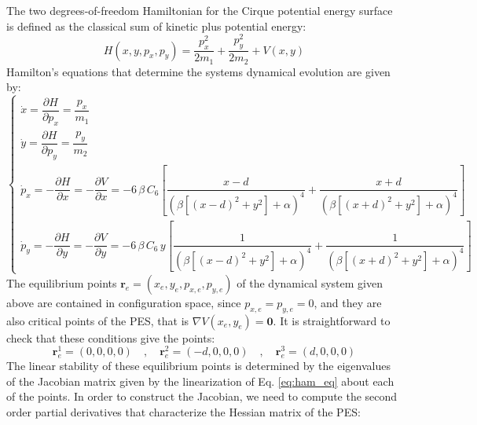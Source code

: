\documentclass[10pt,aps,onecolumn,superscriptaddress]{revtex4-2}
\begin{document}
The two degrees-of-freedom Hamiltonian for the Cirque potential energy surface is defined as the classical sum of kinetic plus potential energy:
\begin{equation}
H(x,y,p_x,p_y) = \dfrac{p_x^2}{2 m_1} + \dfrac{p_y^2}{2 m_2} + V(x,y)
\label{eq:hamil}
\end{equation}
Hamilton's equations that determine the systems dynamical evolution are given by:
\begin{equation}
\begin{cases}
\dot{x} = \dfrac{\partial H}{\partial p_x} = \dfrac{p_x}{m_1} \\[.5cm]
\dot{y} = \dfrac{\partial H}{\partial p_y} = \dfrac{p_y}{m_2} \\
\dot{p}_x = - \dfrac{\partial H}{\partial x} = - \dfrac{\partial V}{\partial x} = - 6 \, \beta \, C_6 \left[\dfrac{x - d}{\left(\beta\left[\left(x - d\right)^2 + y^2\right] + \alpha\right)^4} + \dfrac{x + d}{\left(\beta\left[\left(x + d\right)^2 + y^2\right] + \alpha\right)^4}\right] \\[.7cm]
\dot{p}_y = - \dfrac{\partial H}{\partial y} = - \dfrac{\partial V}{\partial y} = - 6 \, \beta \, C_6 \, y \left[\dfrac{1}{\left(\beta\left[\left(x - d\right)^2 + y^2\right] + \alpha\right)^4} + \dfrac{1}{\left(\beta\left[\left(x + d\right)^2 + y^2\right] + \alpha\right)^4}\right]
\end{cases}
\label{eq:ham_eq}
\end{equation}
The equilibrium points $\mathbf{r}_e = (x_e,y_e,p_{x,e},p_{y,e})$ of the dynamical system given above are contained in configuration space, since $p_{x,e} = p_{y,e} = 0$, and they are also critical points of the PES, that is $\nabla V (x_e,y_e) = \mathbf{0}$. It is straightforward to check that these conditions give the points:
\begin{equation}
\mathbf{r}_e^{1} = (0,0,0,0) \quad,\quad \mathbf{r}_e^{2} = (-d,0,0,0) \quad,\quad \mathbf{r}_e^{3} = (d,0,0,0)
\label{eq:eq_pts}
\end{equation}
The linear stability of these equilibrium points is determined by the eigenvalues of the Jacobian matrix given by the linearization of Eq. \eqref{eq:ham_eq} about each of the points. In order to construct the Jacobian, we need to compute the second order partial derivatives that characterize the Hessian matrix of the PES:
\end{document}
